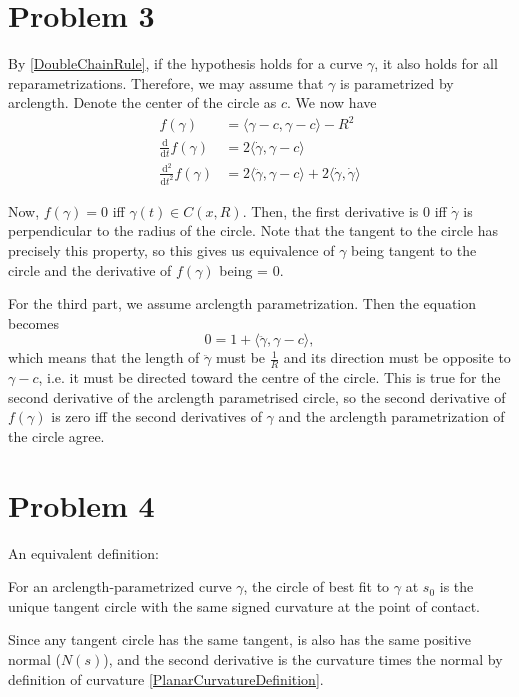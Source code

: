 \section{Problem 3}

By \ref{DoubleChainRule}, if the hypothesis holds for a curve \(\gamma\), it also holds for all reparametrizations. Therefore, we may assume that \(\gamma\) is parametrized by arclength. Denote the center of the circle as \(c\). We now have
\begin{align*}
    f(\gamma) &= \langle \gamma - c, \gamma - c \rangle - R^2 \\
    \frac{\mathrm{d}}{\mathrm{d}t} f(\gamma) &= 2\langle \dot\gamma, \gamma - c \rangle \\
    \frac{\mathrm{d^2}}{\mathrm{d}t^2} f(\gamma) &= 2\langle \ddot\gamma, \gamma - c \rangle + 2\langle \dot\gamma, \dot\gamma \rangle
\end{align*}

Now, \(f(\gamma) = 0\) iff \(\gamma(t) \in C(x, R)\). Then, the first derivative is 0 iff \(\dot\gamma\) is perpendicular to the radius of the circle. Note that the tangent to the circle has precisely this property, so this gives us equivalence of \(\gamma\) being tangent to the circle and the derivative of \(f(\gamma)\) being = 0.

For the third part, we assume arclength parametrization. Then the equation becomes
\[
0 = 1 + \langle \ddot\gamma, \gamma - c \rangle,
\]
which means that the length of \( \ddot\gamma \) must be \( \frac1R\) and its direction must be opposite to \(\gamma - c \), i.e. it must be directed toward the centre of the circle. This is true for the second derivative of the arclength parametrised circle, so the second derivative of \( f( \gamma ) \) is zero iff the second derivatives of \(\gamma\) and the arclength parametrization of the circle agree.

\section{Problem 4} An equivalent definition:

\begin{defn}
    For an arclength-parametrized curve \(\gamma\), the circle of best fit to \(\gamma\) at \( s_0 \) is the unique tangent circle with the same signed curvature at the point of contact.
\end{defn}

Since any tangent circle has the same tangent, is also has the same positive normal (\(N(s)\)), and the second derivative is the curvature times the normal by definition of curvature \ref{PlanarCurvatureDefinition}.

